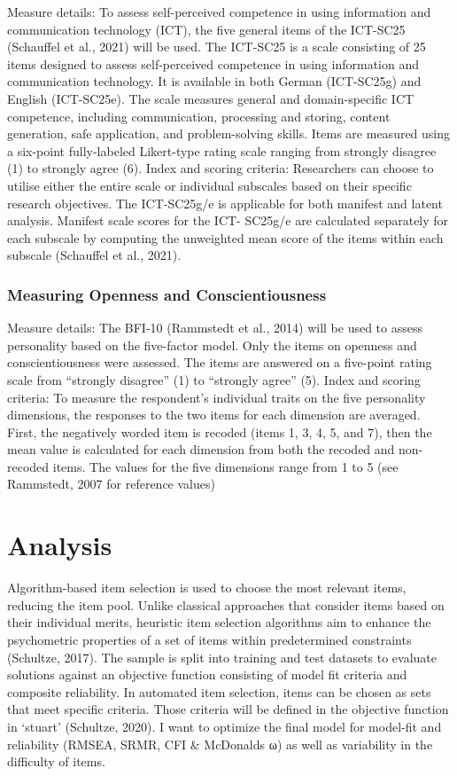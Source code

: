 \documentclass[
  12pt,
  a4paper,
  twoside]{article}
\begin{document}
Measure details: To assess self-perceived competence in using
information and communication technology (ICT), the five general items
of the ICT-SC25 (Schauffel et al., 2021) will be used. The ICT-SC25 is a
scale consisting of 25 items designed to assess self-perceived
competence in using information and communication technology. It is
available in both German (ICT-SC25g) and English (ICT-SC25e). The scale
measures general and domain-specific ICT competence, including
communication, processing and storing, content generation, safe
application, and problem-solving skills. Items are measured using a
six-point fully-labeled Likert-type rating scale ranging from strongly
disagree (1) to strongly agree (6). Index and scoring criteria:
Researchers can choose to utilise either the entire scale or individual
subscales based on their specific research objectives. The ICT-SC25g/e
is applicable for both manifest and latent analysis. Manifest scale
scores for the ICT- SC25g/e are calculated separately for each subscale
by computing the unweighted mean score of the items within each subscale
(Schauffel et al., 2021).

\subsubsection{Measuring Openness and
Conscientiousness}\label{measuring-openness-and-conscientiousness}

Measure details: The BFI-10 (Rammstedt et al., 2014) will be used to
assess personality based on the five-factor model. Only the items on
openness and conscientiousness were assessed. The items are answered on
a five-point rating scale from ``strongly disagree'' (1) to ``strongly
agree'' (5). Index and scoring criteria: To measure the respondent's
individual traits on the five personality dimensions, the responses to
the two items for each dimension are averaged. First, the negatively
worded item is recoded (items 1, 3, 4, 5, and 7), then the mean value is
calculated for each dimension from both the recoded and non- recoded
items. The values for the five dimensions range from 1 to 5 (see
Rammstedt, 2007 for reference values)

\section{Analysis}\label{analysis}

Algorithm-based item selection is used to choose the most relevant
items, reducing the item pool. Unlike classical approaches that consider
items based on their individual merits, heuristic item selection
algorithms aim to enhance the psychometric properties of a set of items
within predetermined constraints (Schultze, 2017). The sample is split
into training and test datasets to evaluate solutions against an
objective function consisting of model fit criteria and composite
reliability. In automated item selection, items can be chosen as sets
that meet specific criteria. Those criteria will be defined in the
objective function in `stuart' (Schultze, 2020). I want to optimize the
final model for model-fit and reliability (RMSEA, SRMR, CFI \& McDonalds
ω) as well as variability in the difficulty of items.
\end{document}
